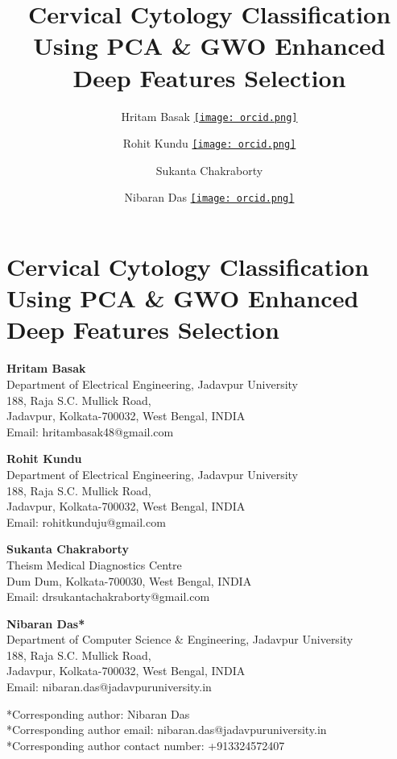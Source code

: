 \documentclass{llncs}
\newcommand{\orcid}[1]{\href{https://orcid.org/#1}{\texttt{[image: orcid.png]}}}
\begin{document}
\title{Cervical Cytology Classification Using PCA \& GWO Enhanced Deep Features Selection}



\author{Hritam Basak \orcid{0000-0001-5921-1230} \and 
Rohit Kundu \orcid{0000-0001-8665-8898} \and
Sukanta Chakraborty \and
Nibaran Das \orcid{0000-0002-2426-9915}
}




\section*{Cervical Cytology Classification Using PCA \& GWO Enhanced Deep Features Selection}
\begin{center}
    \textbf{Hritam Basak}\\
    Department of Electrical Engineering, Jadavpur University\\
    188, Raja S.C. Mullick Road,\\
    Jadavpur, Kolkata-700032, West Bengal, INDIA\\
    Email: hritambasak48@gmail.com
\end{center}
\begin{center}
    \textbf{Rohit Kundu}\\
    Department of Electrical Engineering, Jadavpur University\\
    188, Raja S.C. Mullick Road,\\
    Jadavpur, Kolkata-700032, West Bengal, INDIA\\
    Email: rohitkunduju@gmail.com
\end{center}
\begin{center}
    \textbf{Sukanta Chakraborty}\\
    Theism Medical Diagnostics Centre\\
    Dum Dum, Kolkata-700030, West Bengal, INDIA\\
    Email: drsukantachakraborty@gmail.com
\end{center}
\begin{center}
    \textbf{Nibaran Das*}\\
    Department of Computer Science \& Engineering, Jadavpur University\\
    188, Raja S.C. Mullick Road,\\
    Jadavpur, Kolkata-700032, West Bengal, INDIA\\
    Email: nibaran.das@jadavpuruniversity.in
\end{center}
\begin{center}
    *Corresponding author: Nibaran Das\\
    *Corresponding author email: nibaran.das@jadavpuruniversity.in\\
    *Corresponding author contact number: +913324572407
\end{center}
\end{document}

